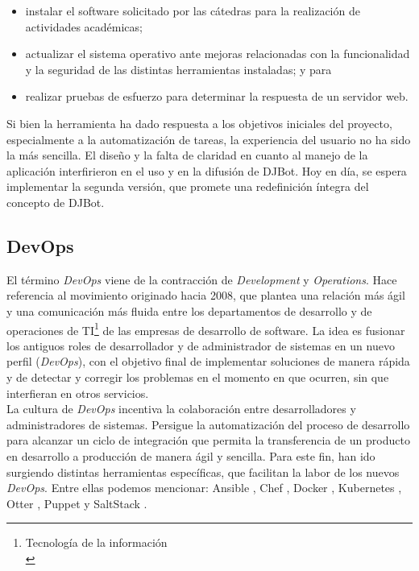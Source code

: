 \documentclass[a4paper,12pt]{article}
\begin{document}
\begin{itemize}
\item instalar el software solicitado por las cátedras para la realización de actividades académicas;\\
\item actualizar el sistema operativo ante mejoras relacionadas con la funcionalidad y la seguridad de las distintas herramientas instaladas; y para\\
\item realizar pruebas de esfuerzo para determinar la respuesta de un servidor web.\\
\end{itemize}

Si bien la herramienta ha dado respuesta a los objetivos iniciales del proyecto, especialmente a la automatización de tareas, la experiencia del usuario no ha sido la más sencilla. El diseño y la falta de claridad en cuanto al manejo de la aplicación interfirieron en el uso y en la difusión de DJBot. Hoy en día, se espera implementar la segunda versión, que promete una redefinición íntegra del concepto de DJBot.\\

\subsection{DevOps}
\label{sec:orgheadline12}

El término \emph{DevOps} viene de la contracción de \emph{Development} y \emph{Operations}. Hace referencia al movimiento originado hacia 2008, que plantea una relación más ágil y una comunicación más fluida entre los departamentos de desarrollo y de operaciones de TI\footnote{Tecnología de la información\\} de las empresas de desarrollo de software. La idea es fusionar los antiguos roles de desarrollador y de administrador de sistemas en un nuevo perfil (\emph{DevOps}), con el objetivo final de implementar soluciones de manera rápida y de detectar y corregir los problemas en el momento en que ocurren, sin que interfieran en otros servicios.\\

La cultura de \emph{DevOps} incentiva la colaboración entre desarrolladores y administradores de sistemas. Persigue la automatización del proceso de desarrollo para alcanzar un ciclo de integración que permita la transferencia de un producto en desarrollo a producción de manera ágil y sencilla. Para este fin, han ido surgiendo distintas herramientas específicas, que facilitan la labor de los nuevos \emph{DevOps}. Entre ellas podemos mencionar: Ansible \cite{Ansible}, Chef \cite{Chef}, Docker \cite{Docker}, Kubernetes \cite{Kubernetes}, Otter \cite{Otter}, Puppet \cite{Puppet} y SaltStack \cite{SALTSTACK}.\\
\end{document}

